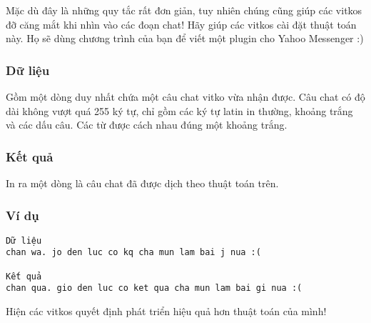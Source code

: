    Mặc dù đây là những quy tắc rất đơn giản, tuy nhiên chúng cũng giúp các vitkos đỡ căng mắt khi nhìn vào các đoạn chat! Hãy giúp các vitkos cài đặt thuật toán này. Họ sẽ dùng chương trình của bạn để viết một plugin cho Yahoo Messenger :)  

\subsubsection{   Dữ liệu  }

   Gồm một dòng duy nhất chứa một câu chat vitko vừa nhận được. Câu chat có độ dài không vượt quá 255 ký tự, chỉ gồm các ký tự latin in thường, khoảng trắng và các dấu câu. Các từ được cách nhau đúng một khoảng trắng.  

\subsubsection{   Kết quả  }

   In ra một dòng là câu chat đã được dịch theo thuật toán trên.  

\subsubsection{   Ví dụ  }
\begin{verbatim}
Dữ liệu
chan wa. jo den luc co kq cha mun lam bai j nua :(

Kết quả 
chan qua. gio den luc co ket qua cha mun lam bai gi nua :(
\end{verbatim}

   Hiện các vitkos quyết định phát triển hiệu quả hơn thuật toán của mình!  
